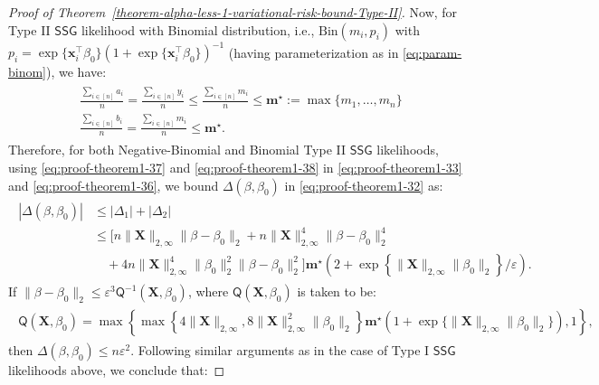\documentclass[10pt,a4paper]{amsart}
\begin{document}
\begin{proof}[Proof of Theorem~\ref{theorem-alpha-less-1-variational-risk-bound-Type-II}]
Now, for Type II $\mathsf{SSG}$ likelihood with Binomial distribution, i.e., $\mathrm{Bin}(m_i, p_i)$ with $p_i = \exp\{\mathbf{x}_i^{\top}\beta_0\}(1 + \exp\{\mathbf{x}_i^{\top}\beta_0\})^{-1}$ (having parameterization as in \eqref{eq:param-binom}), we have:
\begin{align}\label{eq:proof-theorem1-38}
    \begin{split}
        &\frac{\sum_{i\in[n]} a_i}{n} = \frac{\sum_{i\in [n]}y_i}{n} \leq \frac{\sum_{i\in [n]}m_i}{n} \leq \mathbf{m}^{\star} := \max\{m_1, \ldots, m_n\}\\
        &\frac{\sum_{i\in [n]}b_i}{n} = \frac{\sum_{i\in [n]}m_i}{n} \leq \mathbf{m}^{\star}.
    \end{split}
\end{align}
Therefore, for both Negative-Binomial and Binomial Type II $\mathsf{SSG}$ likelihoods, using \eqref{eq:proof-theorem1-37} and \eqref{eq:proof-theorem1-38} in \eqref{eq:proof-theorem1-33} and \eqref{eq:proof-theorem1-36}, we bound $\Delta(\beta, \beta_0)$ in \eqref{eq:proof-theorem1-32} as:
%
\begin{align}\label{eq:proof-theorem1-39}
\begin{split}
|\Delta(\beta, \beta_{0})| &\leq |\Delta_1| + |\Delta_2|\\
&\leq [n\lVert\mathbf{X}\rVert_{2, \infty}\lVert \beta-\beta_0\rVert_{2} + n\lVert\mathbf{X}\rVert_{2, \infty}^{4}\lVert\beta-\beta_0\rVert_{2}^{4}\\
&\quad+ 4n\lVert \mathbf{X}\rVert_{2, \infty}^{4}\lVert\beta_0\rVert_{2}^{2}\lVert\beta-\beta_0\rVert_{2}^{2}] \mathbf{m}^{\star}\left(2 + \exp\left\{\lVert\mathbf{X}\rVert_{2, \infty}\lVert\beta_0\rVert_{2}\right\}/\varepsilon\right).
\end{split}
\end{align}
%
If $\lVert\beta - \beta_0\rVert_2 \leq \varepsilon^3 \mathsf{Q}^{-1}( \mathbf{X}, \beta_0)$, where $\mathsf{Q}(\mathbf{X}, \beta_0)$ is taken to be:
\begin{align}\label{eq:proof-theorem1-40}
    \begin{split}
        \mathsf{Q}(\mathbf{X}, \beta_0) = \max\left\{\max\left\{4\lVert\mathbf{X}\rVert_{2, \infty}, 8\lVert\mathbf{X}\rVert_{2, \infty}^{2}\lVert\beta_0\rVert_{2}\right\}\mathbf{m}^{\star}\left(1 + \exp\{\lVert\mathbf{X}\rVert_{2, \infty}\lVert\beta_0\rVert_{2}\}\right),1\right\},
    \end{split}
\end{align}
then $\Delta(\beta, \beta_0) \leq n\varepsilon^2$. Following similar arguments as in the case of Type I $\mathsf{SSG}$ likelihoods above, we conclude that:

\end{proof}
\end{document}
